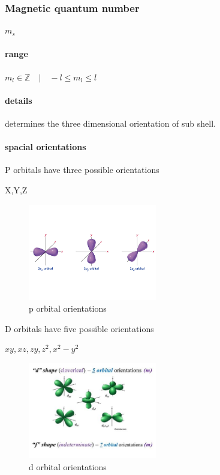 \documentclass[]{article}
\let\oldparagraph\paragraph
\renewcommand{\paragraph}[1]{\oldparagraph{#1}\mbox{}}
\begin{document}
\hypertarget{magnetic-quantum-number}{%
\subsubsection{Magnetic quantum number}\label{magnetic-quantum-number}}

\(m_s\)

\hypertarget{range-2}{%
\paragraph{range}\label{range-2}}

\(m_{l} \in \mathbb{Z} \quad | \quad -l \leq m_{l} \leq l\quad\)

\hypertarget{details-2}{%
\paragraph{details}\label{details-2}}

determines the three dimensional orientation of sub shell.

\hypertarget{spacial-orientations}{%
\paragraph{spacial orientations}\label{spacial-orientations}}

P orbitals have three possible orientations

X,Y,Z

\begin{figure}
\centering
\includegraphics[width=0.5\textwidth,height=\textheight]{Images/dOrbitalOrientation.jpg}
\caption{p orbital orientations}
\end{figure}

D orbitals have five possible orientations

\(xy,xz,zy,z^{2},x^{2}-y^{2}\)

\begin{figure}
\centering
\includegraphics[width=0.5\textwidth,height=\textheight]{Images/dOrbitalOrientations.jpg}
\caption{d orbital orientations}
\end{figure}
\end{document}
